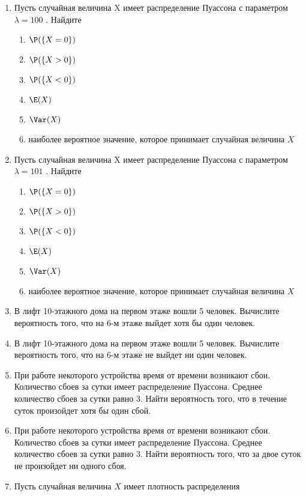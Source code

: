 \begin{enumerate}
\item  Пусть случайная величина X имеет распределение Пуассона с параметром $\lambda = 100$ . Найдите
\begin{enumerate}
	\item $\P(\{X = 0\})$
	\item $\P(\{X > 0\})$
	\item $\P(\{X < 0\})$
	\item $\E(X)$
	\item $\Var(X)$
	\item  наиболее вероятное значение, которое принимает случайная величина $X$
\end{enumerate}


\item  Пусть случайная величина X имеет распределение Пуассона с параметром $\lambda = 101$ . Найдите
\begin{enumerate}
	\item $\P(\{X = 0\})$
	\item $\P(\{X > 0\})$
	\item $\P(\{X < 0\})$
	\item $\E(X)$
	\item $\Var(X)$
	\item  наиболее вероятное значение, которое принимает случайная величина $X$
\end{enumerate}


\item В лифт 10-этажного дома на первом этаже вошли 5 человек. Вычислите
вероятность того, что на 6-м этаже выйдет хотя бы один человек.


\item В лифт 10-этажного дома на первом этаже вошли 5 человек. Вычислите
вероятность того, что на 6-м этаже не выйдет ни один человек.


\item При работе некоторого устройства время от времени возникают сбои.
Количество сбоев за сутки имеет распределение Пуассона. Среднее количество сбоев за сутки равно 3. Найти вероятность того, что в течение суток произойдет хотя бы один сбой.


\item При работе некоторого устройства время от времени возникают сбои.
Количество сбоев за сутки имеет распределение Пуассона. Среднее количество сбоев за сутки равно 3. Найти вероятность того, что за двое суток не произойдет ни одного сбоя.


\item Пусть случайная величина $X$ имеет плотность распределения


\end{enumerate}
